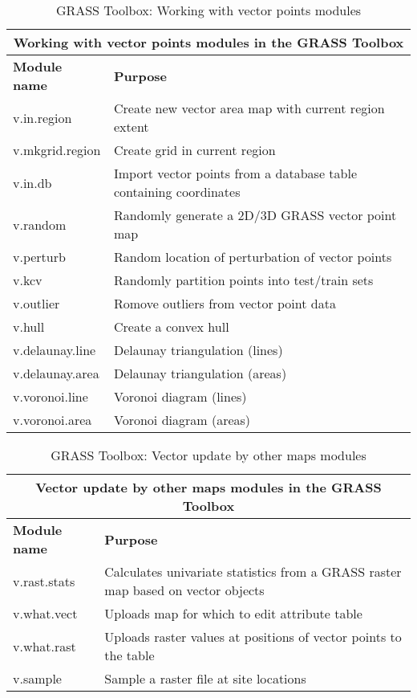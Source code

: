 \begin{table}[ht]
\centering
\caption{GRASS Toolbox: Working with vector points modules}\medskip
 \begin{tabular}{|p{4cm}|p{12cm}|}
  \hline \multicolumn{2}{|c|}{\textbf{Working with vector points modules in the GRASS Toolbox}} \\
  \hline \textbf{Module name} & \textbf{Purpose} \\
  \hline v.in.region & Create new vector area map with current region extent \\
  \hline v.mkgrid.region & Create grid in current region \\
  \hline v.in.db & Import vector points from a database table containing
  coordinates \\
  \hline v.random & Randomly generate a 2D/3D GRASS vector point map \\
  \hline v.perturb & Random location of perturbation of vector points \\ 
  \hline v.kcv & Randomly partition points into test/train sets \\
  \hline v.outlier & Romove outliers from vector point data \\
  \hline v.hull & Create a convex hull \\
  \hline v.delaunay.line & Delaunay triangulation (lines) \\
  \hline v.delaunay.area & Delaunay triangulation (areas) \\
  \hline v.voronoi.line & Voronoi diagram (lines) \\
  \hline v.voronoi.area & Voronoi diagram (areas) \\
\hline
\end{tabular}
\end{table}

\begin{table}[ht]
\centering
\caption{GRASS Toolbox: Vector update by other maps modules}\medskip
 \begin{tabular}{|p{4cm}|p{12cm}|}
  \hline \multicolumn{2}{|c|}{\textbf{Vector update by other maps modules in the GRASS
  Toolbox}} \\
  \hline \textbf{Module name} & \textbf{Purpose} \\
  \hline v.rast.stats & Calculates univariate statistics from a GRASS raster
  map based on vector objects\\
  \hline v.what.vect & Uploads map for which to edit attribute table \\
  \hline v.what.rast & Uploads raster values at positions of vector points to
  the table \\
  \hline v.sample & Sample a raster file at site locations \\
\hline
\end{tabular}
\end{table}

